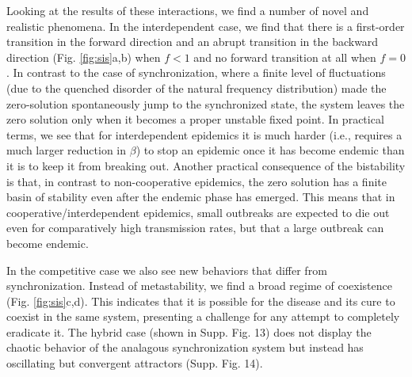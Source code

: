 \documentclass[pre,twocolumn,superscriptaddress]{revtex4}
\newcommand{\1}{\mathds{1}}
\begin{document}
{Looking at the results of these interactions, we find a number of novel and realistic phenomena.
In the interdependent case, we find that there is a first-order transition in the forward direction and an abrupt transition in the backward direction (Fig. \ref{fig:sis}a,b) when $f<1$ and no forward transition at all when $f=0$.
In contrast to the case of synchronization, where a finite level of fluctuations (due to the quenched disorder of the natural frequency distribution) made the zero-solution spontaneously jump to the synchronized state, the system leaves the zero solution only when it becomes a proper unstable fixed point.
In practical terms, we see that for interdependent epidemics it is much harder (i.e., requires a much larger reduction in $\beta$) to stop an epidemic once it has become endemic than it is to keep it from breaking out.
Another practical consequence of the bistability is that, in contrast to non-cooperative epidemics, the zero solution has a finite basin of stability even after the endemic phase has emerged.  
This means that in cooperative/interdependent epidemics, small outbreaks are expected to die out even for comparatively high transmission rates, but that a large outbreak can become endemic.

In the competitive case we also see new behaviors that differ from synchronization.  Instead of metastability, we find a broad regime of coexistence (Fig. \ref{fig:sis}c,d).  This indicates that it is possible for the disease and its cure to coexist in the same system, presenting a challenge for any attempt to completely eradicate it.
The hybrid case (shown in Supp. Fig. 13) does not display the chaotic behavior of the analagous synchronization system but instead has oscillating but convergent attractors (Supp. Fig. 14).

}
\end{document}

